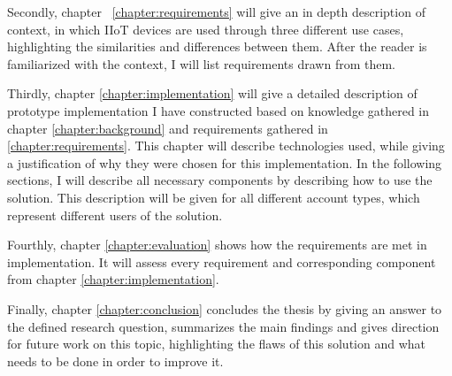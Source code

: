 Secondly, chapter ~\ref{chapter:requirements} will give an in depth description of context, in which IIoT devices are used through three different use cases, highlighting the similarities and differences between them. After the reader is familiarized with the context, I will list requirements drawn from them.

Thirdly, chapter \ref{chapter:implementation} will give a detailed description of prototype implementation I have constructed based on knowledge gathered in chapter \ref{chapter:background} and requirements gathered in \ref{chapter:requirements}. This chapter will describe technologies used, while giving a justification of why they were chosen for this implementation. In the following sections, I will describe all necessary components by describing how to use the solution. This description will be given for all different account types, which represent different users of the solution.

Fourthly, chapter \ref{chapter:evaluation} shows how the requirements are met in implementation. It will assess every requirement and corresponding component from chapter \ref{chapter:implementation}.

Finally, chapter \ref{chapter:conclusion} concludes the thesis by giving an answer to the defined research question, summarizes the main findings and gives direction for future work on this topic, highlighting the flaws of this solution and what needs to be done in order to improve it.
